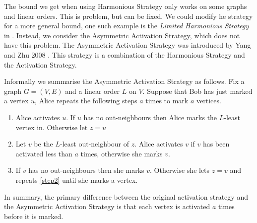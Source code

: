 
The bound we get when using Harmonious Strategy only works on some graphs and linear orders. This is problem, but can be fixed. We could modify he strategy for a more general bound, one such example is the \textit{Limited Harmonious Strategy} in \cite{kierYang2005}. Instead, we consider the Asymmetric Activation Strategy, which does not have this problem. The Asymmetric Activation Strategy was introduced by Yang and Zhu 2008 \cite{yangZhu2008}. This strategy is a combination of the Harmonious Strategy and the Activation Strategy.

Informally we summarise the Asymmetric Activation Strategy as follows. Fix a graph $G=(V,E)$ and a linear order $L$ on $V$. Suppose that Bob has just marked a vertex $u$, Alice repeats the following steps $a$ times to mark $a$ vertices.
\begin{enumerate}
    \item Alice activates $u$. If $u$ has no out-neighbours then Alice marks the $L$-least vertex in. Otherwise let $z=u$
    
    \item Let $v$ be the $L$-least out-neighbour of $z$. Alice activates $v$ if $v$ has been activated less than $a$ times, otherwise she marks $v$. \label{step2}
    
    \item If $v$ has no out-neighbours then she marks $v$. Otherwise she lets $z=v$ and repeats \ref{step2} until she marks a vertex.     
\end{enumerate}
In summary, the primary difference between the original activation strategy and the Asymmetric Activation Strategy is that each vertex is activated $a$ times before it is marked.


